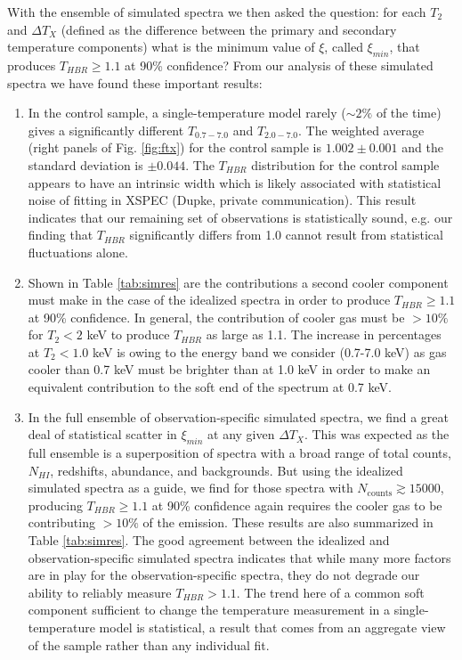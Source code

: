 \documentclass[apj]{emulateapj}
\begin{document}
With the ensemble of simulated spectra we then asked the question:
for each $T_2$ and $\Delta T_X$ (defined as the difference between
the primary and secondary temperature components) what is the minimum
value of $\xi$, called $\xi_{min}$, that produces $T_{HBR} \geq 1.1$ at
90\% confidence? From our analysis of these simulated spectra we have
found these important results:
\begin{enumerate}

\item In the control sample, a single-temperature model rarely
($\sim 2\%$ of the time) gives a significantly different $T_{0.7-7.0}$ and
$T_{2.0-7.0}$. The weighted average (right panels of
Fig. \ref{fig:ftx}) for the control sample is $1.002 \pm 0.001$ and the
standard deviation is $\pm0.044$. The $T_{HBR}$ distribution for the
control sample appears to have an intrinsic width which is likely
associated with statistical noise of fitting in {\textsc{XSPEC}}
(Dupke, private communication). This result indicates that our
remaining set of observations is statistically sound, e.g. our finding
that $T_{HBR}$ significantly differs from 1.0 cannot result from
statistical fluctuations alone.

\item Shown in Table \ref{tab:simres} are the contributions
a second cooler component must make in the case of the idealized
spectra in order to produce $T_{HBR} \geq 1.1$ at 90\% confidence. In
general, the contribution of cooler gas must be $> 10\%$ for $T_2 < 2$
keV to produce $T_{HBR}$ as large as 1.1. The increase in percentages
at $T_2 < 1.0$ keV is owing to the energy band we consider (0.7-7.0
keV) as gas cooler than 0.7 keV must be brighter than at 1.0 keV in
order to make an equivalent contribution to the soft end of the
spectrum at 0.7 keV.

\item In the full ensemble of observation-specific simulated spectra,
we find a great deal of statistical scatter in $\xi_{min}$ at any given
$\Delta T_X$. This was expected as the full ensemble is a
superposition of spectra with a broad range of total counts, $N_{HI}$,
redshifts, abundance, and backgrounds. But using the idealized
simulated spectra as a guide, we find for those spectra with
$N_{\mathrm{counts}} \gtrsim 15000$, producing $T_{HBR} \geq 1.1$ at
90\% confidence again requires the cooler gas to be contributing $>
10\%$ of the emission. These results are also summarized in Table
\ref{tab:simres}. The good agreement between the idealized and
observation-specific simulated spectra indicates that while many more
factors are in play for the observation-specific spectra, they do not
degrade our ability to reliably measure $T_{HBR} > 1.1$.
The trend here of a common soft component sufficient to change the
temperature measurement in a single-temperature model is statistical,
a result that comes from an aggregate view of the sample rather than
any individual fit.


\end{enumerate}
\end{document}
